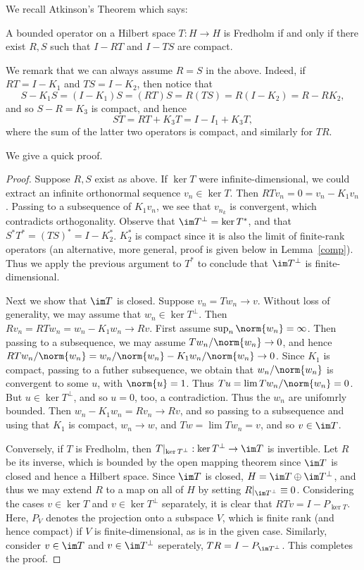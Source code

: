 \documentclass[12pt]{article}
\begin{document}
We recall Atkinson's Theorem which says:
\begin{thm}[Atkinson]A bounded operator on a Hilbert space $T:H \to H$ is Fredholm if and only if there exist $R,S$ such that $I-RT$ and $I-TS$ are compact.\end{thm}
\begin{rk}We remark that we can always assume $R=S$ in the above. Indeed, if $RT = I-K_1$ and $TS = I-K_2$, then notice that
\[S-K_1S = (I-K_1)S = (RT)S = R(TS) = R(I-K_2) = R-RK_2,\]
and so $S-R = K_3$ is compact, and hence
\[ST = RT + K_3T = I -I_1+K_3T,\] where the sum of the latter two operators is compact, and similarly for $TR$.\end{rk}
We give a quick proof.
\begin{proof}Suppose $R,S$ exist as above. If $\ker T$ were infinite-dimensional, we could extract an infinite orthonormal sequence $v_n \in \ker T$. Then $RTv_n = 0 = v_n-K_1v_n$. Passing to a subsequence of $K_1v_n$, we see that $v_{n_k}$ is convergent, which contradicts orthogonality. Observe that $\im T^\bot = \ker T^\ast$, and that $S^\ast T^\ast = (TS)^\ast = I-K_2^\ast$. $K_2^\ast$ is compact since it is also the limit of finite-rank operators (an alternative, more general, proof is given below in Lemma~\ref{comp}). Thus we apply the previous argument to $T^\ast$ to conclude that $\im T^\bot$ is finite-dimensional.

Next we show that $\im T$ is closed. Suppose $v_n = Tw_n \to v$. Without loss of generality, we may assume that $w_n \in \ker T^\bot$. Then $Rv_n = RTw_n = w_n -K_1w_n \to Rv$. First assume $\sup_n \norm{w_n} = \infty$. Then passing to a subsequence,  we may assume $Tw_n/\norm{w_n} \to 0$, and hence $RTw_n/\norm{w_n} = w_n/\norm{w_n} - K_1w_n/\norm{w_n} \to 0$. Since $K_1$ is compact, passing to a futher subsequence, we obtain that $w_n/\norm{w_n}$ is convergent to some $u$, with $\norm{u} = 1$. Thus $Tu = \lim Tw_n/\norm{w_n} = 0$. But $u \in \ker T^\bot$, and so $u = 0$, too, a contradiction. Thus the $w_n$ are unifomrly bounded. Then $w_n - K_1w_n = Rv_n \to Rv$, and so passing to a subsequence and using that $K_1$ is compact, $w_n \to w$, and $Tw = \lim Tw_n = v$, and so $v \in \im T$.

Conversely, if $T$ is Fredholm, then $T|_{\ker T^\bot}:\ker T^\bot \to \im T$ is invertible. Let $R$ be its inverse, which is bounded by the open mapping theorem since $\im T$ is closed and hence a Hilbert space. Since $\im T$ is closed, $H = \im T\oplus \im T^\bot$, and thus we may extend $R$ to a map on all of $H$ by setting $R|_{\im T^\bot} \equiv 0$. Considering the cases $v \in \ker T$ and $v \in \ker T^\bot$ separately, it is clear that $RTv = I-P_{\ker T}$. Here, $P_V$ denotes the projection onto a subspace $V$, which is finite rank (and hence compact) if $V$ is finite-dimensional, as is in the given case. Similarly, consider $v \in \im T$ and $v \in \im T^\bot$ seperately, $TR = I-P_{\im T^\bot}$. This completes the proof.\end{proof}
\end{document}
